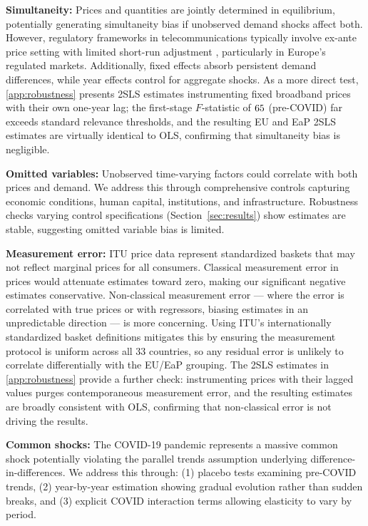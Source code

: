 \textbf{Simultaneity:} Prices and quantities are jointly determined in equilibrium, potentially generating simultaneity bias if unobserved demand shocks affect both. However, regulatory frameworks in telecommunications typically involve ex-ante price setting with limited short-run adjustment \citep{laffont2000competition}, particularly in Europe's regulated markets. Additionally, fixed effects absorb persistent demand differences, while year effects control for aggregate shocks. As a more direct test, \ref{app:robustness} presents 2SLS estimates instrumenting fixed broadband prices with their own one-year lag; the first-stage $F$-statistic of $65$ (pre-COVID) far exceeds standard relevance thresholds, and the resulting EU and EaP 2SLS estimates are virtually identical to OLS, confirming that simultaneity bias is negligible.

\textbf{Omitted variables:} Unobserved time-varying factors could correlate with both prices and demand. We address this through comprehensive controls capturing economic conditions, human capital, institutions, and infrastructure. Robustness checks varying control specifications (Section~\ref{sec:results}) show estimates are stable, suggesting omitted variable bias is limited.

\textbf{Measurement error:} ITU price data represent standardized baskets that may not reflect marginal prices for all consumers. Classical measurement error in prices would attenuate estimates toward zero, making our significant negative estimates conservative. Non-classical measurement error --- where the error is correlated with true prices or with regressors, biasing estimates in an unpredictable direction --- is more concerning. Using ITU's internationally standardized basket definitions mitigates this by ensuring the measurement protocol is uniform across all 33 countries, so any residual error is unlikely to correlate differentially with the EU/EaP grouping. The 2SLS estimates in \ref{app:robustness} provide a further check: instrumenting prices with their lagged values purges contemporaneous measurement error, and the resulting estimates are broadly consistent with OLS, confirming that non-classical error is not driving the results.

\textbf{Common shocks:} The COVID-19 pandemic represents a massive common shock potentially violating the parallel trends assumption underlying difference-in-differences. We address this through: (1) placebo tests examining pre-COVID trends, (2) year-by-year estimation showing gradual evolution rather than sudden breaks, and (3) explicit COVID interaction terms allowing elasticity to vary by period.

